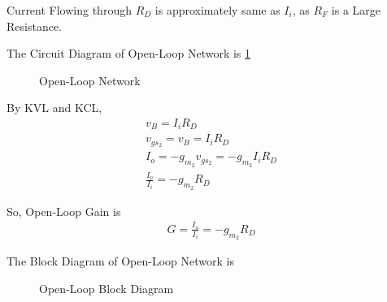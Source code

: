 \begin{enumerate}[label=\thesubsection.\arabic*.,ref=\thesubsection.\theenumi]
Current Flowing through $R_{D}$ is approximately same as $I_{i}$, as $R_{F}$ is a Large Resistance.

The Circuit Diagram of Open-Loop Network is \ref{fig:OpenLoop_Network}
\begin{figure}[ht!]
	\begin{center}
		\resizebox{\columnwidth}{!}{}
	\end{center}
	\caption{Open-Loop Network}
	\label{fig:OpenLoop_Network}
\end{figure}

By KVL and KCL,
\begin{align}
v_{B} = I_{i}R_{D}\\
v_{gs_{2}} = v_{B} = I_{i}R_{D}\\
I_{o} =  -g_{m_{2}}v_{gs_{2}} = -g_{m_{2}}I_{i}R_{D}\\
\frac{I_{o}}{I_{i}} = -g_{m_{2}}R_{D}
\end{align}

So, Open-Loop Gain is
\begin{align}
G = \frac{I_{o}}{I_{i}} =  -g_{m_{2}}R_{D}
\end{align}

The Block Diagram of Open-Loop Network is
\begin{figure}[ht!]
	\begin{center}
		\resizebox{\columnwidth}{!}{}
	\end{center}
	\caption{Open-Loop Block Diagram}
	\label{fig:OpenLoop_Block}
\end{figure}

\end{enumerate}
